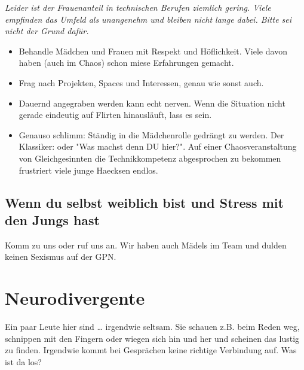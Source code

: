 \documentclass[10pt,foldmark]{leaflet}
\newcommand\dos{\item[$+$]}
\newcommand\donts{\item[$-$]}
\begin{document}
\emph{Leider ist der Frauenanteil in technischen Berufen ziemlich
  gering. Viele empfinden das Umfeld als unangenehm und bleiben nicht
  lange dabei. Bitte sei nicht der Grund dafür.}

\label{sec-2-1}
\begin{itemize}
\dos Behandle Mädchen und Frauen mit Respekt und Höflichkeit. Viele davon
haben (auch im Chaos) schon miese Erfahrungen gemacht.
\dos Frag nach Projekten, Spaces und Interessen, genau wie sonst auch.
\label{sec-2-2}
\donts Dauernd angegraben werden kann echt nerven. Wenn die Situation
  nicht gerade eindeutig auf Flirten hinausläuft, lass es sein.
\donts Genauso schlimm: Ständig in die Mädchenrolle gedrängt zu
  werden. Der Klassiker: oder "Was machst denn DU hier?". Auf einer
  Chaosveranstaltung von Gleichgesinnten die Technikkompetenz
  abgesprochen zu bekommen frustriert viele junge Haecksen endlos.
\end{itemize}

\subsection{Wenn du selbst weiblich bist und Stress mit den Jungs hast}
Komm zu uns oder ruf uns an. Wir haben auch Mädels im Team und dulden
keinen Sexismus auf der GPN.


\section{Neurodivergente}
\label{sec-3}
Ein paar Leute hier sind \ldots{} irgendwie seltsam. Sie schauen
z.B. beim Reden weg, schnippen mit den Fingern oder wiegen sich hin
und her und scheinen das lustig zu finden. Irgendwie kommt bei
Gesprächen keine richtige Verbindung auf. Was ist da los?
\end{document}

